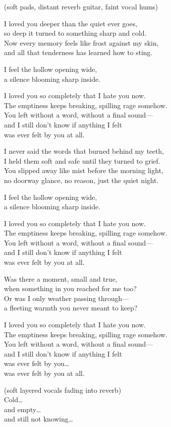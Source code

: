 \begin{lyrics}
(soft pads, distant reverb guitar, faint vocal hums)

I loved you deeper than the quiet ever goes,\\
so deep it turned to something sharp and cold.\\
Now every memory feels like frost against my skin,\\
and all that tenderness has learned how to sting.

I feel the hollow opening wide,\\
a silence blooming sharp inside.

I loved you so completely that I hate you now.\\
The emptiness keeps breaking, spilling rage somehow.\\
You left without a word, without a final sound—\\
and I still don’t know if anything I felt\\
was ever felt by you at all.

I never said the words that burned behind my teeth,\\
I held them soft and safe until they turned to grief.\\
You slipped away like mist before the morning light,\\
no doorway glance, no reason, just the quiet night.

I feel the hollow opening wide,\\
a silence blooming sharp inside.

I loved you so completely that I hate you now.\\
The emptiness keeps breaking, spilling rage somehow.\\
You left without a word, without a final sound—\\
and I still don’t know if anything I felt\\
was ever felt by you at all.

Was there a moment, small and true,\\
when something in you reached for me too?\\
Or was I only weather passing through—\\
a fleeting warmth you never meant to keep?

I loved you so completely that I hate you now.\\
The emptiness keeps breaking, spilling rage somehow.\\
You left without a word, without a final sound—\\
and I still don’t know if anything I felt\\
was ever felt by you…\\
was ever felt by you at all.

(soft layered vocals fading into reverb)\\
Cold…\\
and empty…\\
and still not knowing…
\end{lyrics}

